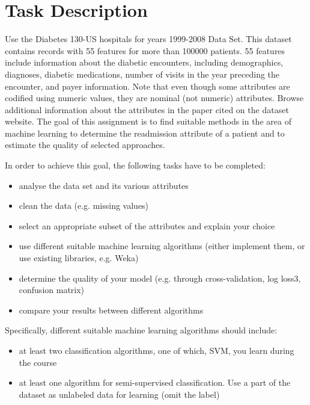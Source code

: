 \section{Task Description}
\label{task}

Use the Diabetes 130-US hospitals for years 1999-2008 Data Set. This dataset contains
records with 55 features for more than 100000 patients. 55 features include information
about the diabetic encounters, including demographics, diagnoses, diabetic medications,
number of visits in the year preceding the encounter, and payer information. Note that
even though some attributes are codified using numeric values, they are nominal (not
numeric) attributes. Browse additional information about the attributes in the paper
cited on the dataset website. The goal of this assignment is to find suitable methods in the area of machine learning to determine the readmission attribute of a patient and to estimate the quality of selected approaches.

In order to achieve this goal, the following tasks have to be completed:
\begin{itemize}
	\item[\textbullet] analyse the data set and its various attributes
	\item[\textbullet] clean the data (e.g. missing values)
	\item[\textbullet] select an appropriate subset of the attributes and explain your choice
	\item[\textbullet] use different suitable machine learning algorithms (either implement them, or use existing libraries, e.g. Weka)

	\item[\textbullet] determine the quality of your model (e.g. through cross-validation, log loss3, confusion matrix)
	\item[\textbullet] compare your results between different algorithms
\end{itemize}

Specifically, different suitable machine learning algorithms should include:
\begin{itemize}
	\item[\textbullet] at least two classification algorithms, one of which, SVM, you learn during the course
	\item[\textbullet] at least one algorithm for semi-supervised classification. Use a part of the dataset	as unlabeled data for learning (omit the label)
\end{itemize}